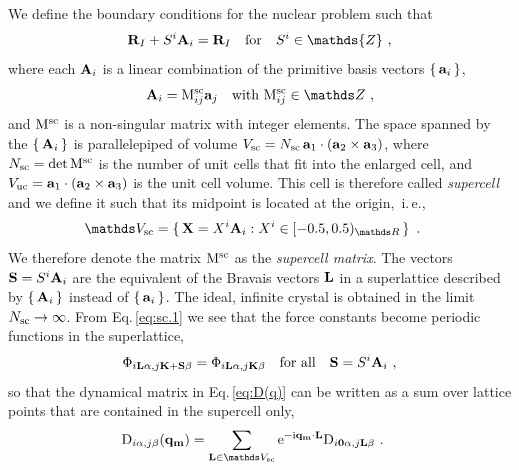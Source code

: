 We define the boundary conditions for the nuclear problem such that
\begin{align}
	\b R_I + S^i \b A_i = \b R_I \quad\text{for}\quad S^i \in \mathds{Z}~,
	\label{eq:sc.1}
\end{align}
where each ${\bf A}_i$ is a linear combination of the primitive basis vectors $\set{{\bf a}_i}$,
\begin{align}
{\bf A}_i = {\rm M}_{ij}^{\rm sc} {\bf a}_j\quad\text{with } {\rm M}_{ij}^{\rm sc} \in \mathds Z~,
\end{align}
and $\rm M^{\rm sc}$ is a non-singular matrix with integer elements. The space spanned by the $\set{{\bf A}_i}$ is parallelepiped of volume $V_{\rm sc} = N_{\rm sc} \, {\bf a}_1 \cdot ({\bf a}_2 \times {\bf a}_3)$, where $N_{\rm sc} = \det {\rm M}^{\rm sc}$ is the number of unit cells that fit into the enlarged cell, and $V_{\rm uc} = {\bf a}_1 \cdot ({\bf a}_2 \times {\bf a}_3)$ is the unit cell volume. This cell is therefore called \emph{supercell} and we define it such that its midpoint is located at the origin,~i.\,e.,~
\begin{align}
	\mathds V_{\rm sc}
		&= \set{{\bf X} = X^i {\bf A}_i : X^i \in {[-0.5, 0.5)_{\mathds R}}}~.
	\label{eq:supercell}
\end{align}
We therefore denote the matrix ${\rm M}^{\rm sc}$ as the \emph{supercell matrix}.
The vectors \mbox{${\bf S} = S^i {\bf A}_i$} are the equivalent of the Bravais vectors ${\bf L}$ in a superlattice described by $\set{ {\bf A}_i }$ instead of $\set{ {\bf a}_i}$.
The ideal, infinite crystal is obtained in the limit $N_{\rm sc} \rightarrow \infty$.
From Eq.\,\eqref{eq:sc.1} we see that the force constants become periodic functions in the superlattice,
\begin{align}
	\Phi_{i {\bf L} \alpha, j {\bf K} + \b S \beta} 
		= \Phi_{i {\bf L} \alpha, j {\bf K} \beta} \quad\text{for all}\quad \b S = S^i \b A_i~,
	\label{eq:fc.sym.2}
\end{align}
so that the dynamical matrix in Eq.\,\eqref{eq:D(q)} can be written as a sum over lattice points that are contained in the supercell only,
\begin{align}
	{\rm D}_{i \alpha, j \beta} (\b q_{\bf m}) 	
		&= %
	\sum_{\b L \in \mathds V_{\rm sc}} {\rm e}^{- \im \b q_{\bf m} \cdot \b L} {\rm D}_{i \b 0 \alpha, j \b L \beta}~.
	\label{eq:D^S(q).2}
\end{align}

